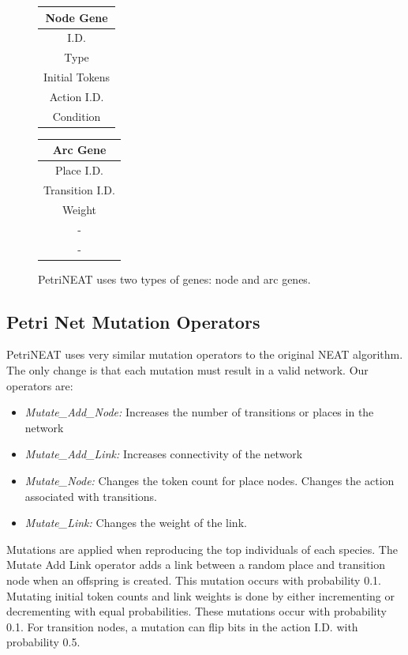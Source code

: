 \documentclass[12pt,a4paper,twocolumn]{article}
\begin{document}
\begin{figure}
\centering
\begin{tabular}{|c|}
\hline
Node Gene\\ \hline
I.D. \\
Type \\
Initial Tokens \\
Action I.D. \\
Condition \\
\hline
\end{tabular}
\begin{tabular}{|c|}
\hline
Arc Gene\\ \hline
Place I.D.\\
Transition I.D.\\
Weight \\
 - \\
 -\\
\hline
\end{tabular}
\caption{PetriNEAT uses two types of genes: node and arc genes.}
\end{figure}


\subsection{Petri Net Mutation Operators}

PetriNEAT uses very similar mutation operators to the original NEAT algorithm. The only change is that each mutation must result in a valid network. Our operators are:
\begin{itemize}
\item \emph{Mutate{\_}Add{\_}Node:} Increases the number of transitions or places in the network
\item \emph{Mutate{\_}Add{\_}Link:}  Increases connectivity of the network
\item \emph{Mutate{\_}Node:}  Changes the token count for place nodes. Changes the action associated with transitions.
\item \emph{Mutate{\_}Link:} Changes the weight of the link.
\end{itemize}

Mutations are applied when reproducing the top individuals of each species. The Mutate Add Link operator adds a link between a random place and transition node when an offspring is created. This mutation occurs with probability 0.1. Mutating initial token counts and link weights is done by either incrementing or decrementing with equal probabilities. These mutations occur with probability 0.1. For transition nodes, a mutation can flip bits in the action I.D. with probability 0.5. 
\end{document}
